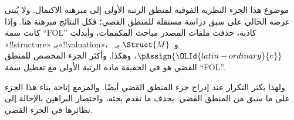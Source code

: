 \documentclass[../../include/open-logic-part]{subfiles}
\begin{document}

\begin{editorial}
  موضوع هذا الجزء النظرية الفوقية لمنطق الرتبة الأولى إلى مبرهنة
  الاكتمال. ولا يُبنى عرضه الحالي على سبق دراسة مستقلة للمنطق القضي؛
  فكل النتائج مبرهنة هنا. وإذا كانت سمة ``FOL'' كاذبة، حذفت ملفات
  المصدر مباحث المكممات، وأبدلت «!!{structure}» بـ«!!{valuation}»،
  و~$\Struct{M}$ بـ~$\pAssign{\OLId{latin-ordinary}{v}}$، وهكذا. وأكثر الجزء المخصص
  للمنطق القضي هو في الحقيقة مادة الرتبة الأولى مع تعطيل سمة
  ``FOL''.

  ولهذا يكثر التكرار عند إدراج جزء المنطق القضي أيضًا. والمزمع إتاحة
  بناء هذا الجزء على ما سبق من المنطق القضي: بحذف ما تقدم بحثه،
  واختصار البراهين بالإحالة إلى نظائرها في الجزء القضي.
\end{editorial}












\OLEndPartHook
\end{document}
